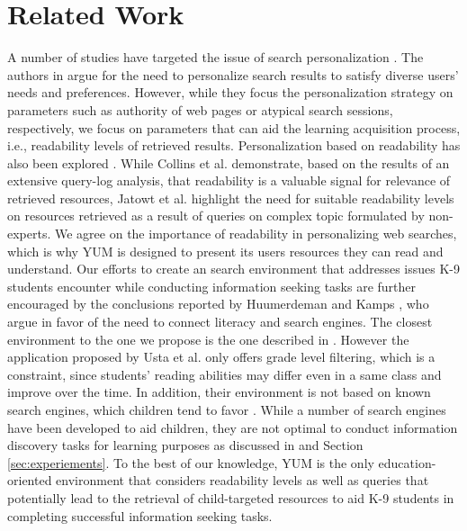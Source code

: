 \documentclass{sig-alternate-05-2015}
\begin{document}
\section{Related Work}
A number of studies have targeted the issue of search personalization \cite{Col11, Eic13, Jat12, Wan13}. The authors in \cite{Eic13, Wan13} argue for the need to personalize search results to satisfy diverse users' needs and preferences. However, while they  focus the personalization strategy on parameters such as authority of web pages or atypical search sessions, respectively, we focus on parameters that can aid the learning acquisition process, i.e., readability levels of retrieved results. Personalization based on readability has also been explored \cite{Col11, Jat12}. While Collins et al. \cite{Col11} demonstrate, based on the results of an extensive query-log analysis, that readability is a valuable signal for relevance of retrieved resources, Jatowt et al. \cite{Jat12} highlight the need for suitable readability levels on resources retrieved as a result of queries on complex topic formulated by non-experts. We agree on the importance of readability in personalizing web searches, which is why YUM is designed to present its users resources they can read and understand.
 Our efforts to create an search environment that addresses issues K-9 students encounter while conducting information seeking tasks are further encouraged by the conclusions reported by Huumerdeman and Kamps \cite{Huu15}, who argue in favor of the need to connect literacy and search engines. The closest environment to the one we propose is the one described in \cite{Ust14}. However the application proposed by Usta et al. only offers grade level filtering, which is a constraint, since students' reading abilities may differ even in a same class and improve over the time\cite{sh13}. In addition, their environment is not based on known search engines, which children tend to favor \cite{Bil13}. While a number of search engines have been developed to aid children, they are not optimal to conduct information discovery tasks for learning purposes as discussed in \cite{Gos13} and Section \ref{sec:experiements}. To the best of our knowledge, YUM is the only education-oriented environment that considers readability levels as well as queries that potentially lead to the retrieval of child-targeted resources to aid K-9 students in completing successful information seeking tasks.
\end{document}
